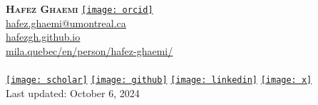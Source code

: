 \documentclass[A4,11pt]{article}
\begin{document}
%
\begin{minipage}[c]{0.4\textwidth}
    \textbf{\Huge \scshape{Hafez Ghaemi}} \href{https://orcid.org/0000-0001-6326-5258}{\texttt{[image: orcid]}} \\ \vspace{1pt} 
    \href{mailto:hafez.ghaemi@umontreal.ca}{\underline{hafez.ghaemi@umontreal.ca}}\\ \vspace{1pt} 
      \href{https://hafezgh.github.io/}{\underline{hafezgh.github.io}}\\ \vspace{1pt} 
      \href{https://mila.quebec/en/person/hafez-ghaemi/}{\underline{mila.quebec/en/person/hafez-ghaemi/}} \\ \\  \vspace{1pt}
    \href{https://scholar.google.com/citations?user=JCLX6oYAAAAJ&hl=en}{\texttt{[image: scholar]}}
    \href{https://github.com/hafezgh}{\texttt{[image: github]}}
    \href{https://www.linkedin.com/in/hafez-ghaemi-618b8287/}{\texttt{[image: linkedin]}}
    \href{https://x.com/hafezghm}{\texttt{[image: x]}}\\
    Last updated: October 6, 2024
\end{minipage}

\end{document}
